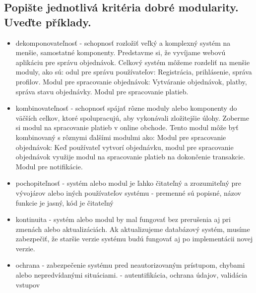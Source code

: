 \subsection{Popište jednotlivá kritéria dobré modularity. Uveďte příklady.}
\begin{itemize}
    \item dekomponovateľnosť - schopnosť rozložiť veľký a komplexný systém na menšie, samostatné komponenty. Predstavme si, že vyvíjame webovú aplikáciu pre správu objednávok. Celkový systém môžeme rozdeliť na menšie moduly, ako sú: odul pre správu používateľov: Registrácia, prihlásenie, správa profilov. Modul pre spracovanie objednávok: Vytváranie objednávok, platby, správa stavu objednávky. Modul pre spracovanie platieb.
    \item kombinovateľnosť - schopnosť spájať rôzne moduly alebo komponenty do väčších celkov, ktoré spolupracujú, aby vykonávali zložitejšie úlohy. Zoberme si modul na spracovanie platieb v online obchode. Tento modul môže byť kombinovaný s rôznymi ďalšími modulmi ako: Modul pre spracovanie objednávok: Keď používateľ vytvorí objednávku, modul pre spracovanie objednávok využije modul na spracovanie platieb na dokončenie transakcie. Modul pre notifikácie.
    \item pochopiteľnosť - systém alebo modul je ľahko čitateľný a zrozumiteľný pre vývojárov alebo iných používateľov systému - premenné sú popisné, názov funkcie je jasný, kód je čitateľný
    \item kontinuita - systém alebo modul by mal fungovať bez prerušenia aj pri zmenách alebo aktualizáciách. Ak aktualizujeme databázový systém, musíme zabezpečiť, že staršie verzie systému budú fungovať aj po implementácii novej verzie.
    \item ochrana - zabezpečenie systému pred neautorizovaným prístupom, chybami alebo nepredvídanými situáciami. - autentifikácia, ochrana údajov, validácia vstupov
\end{itemize}


